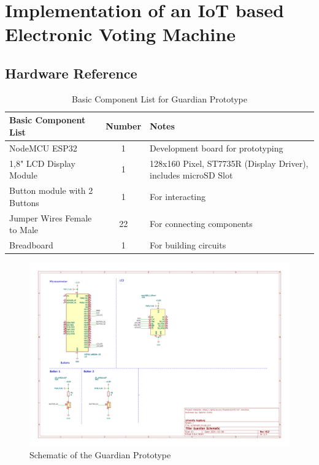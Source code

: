 \chapter{Implementation of an IoT based Electronic Voting Machine}

\section{Hardware Reference}

\begin{table}[h!]
    \centering
    \begin{tabular}{|l|c|p{5cm}|}
        \hline
        \textbf{Basic Component List} & \textbf{Number} & \textbf{Notes} \\
        \hline
        NodeMCU ESP32  & 1 & Development board for prototyping \\
        \hline
        1,8" LCD Display Module  & 1 & 128x160 Pixel, ST7735R (Display Driver), includes microSD Slot \\
        \hline
        Button module with 2 Buttons & 1 & For interacting \\
        \hline
		Jumper Wires Female to Male & 22 & For connecting components \\
        \hline
        Breadboard & 1 & For building circuits \\
        \hline
    \end{tabular}
    \caption{Basic Component List for Guardian Prototype}
    \label{tab:basic-component-list}
\end{table}

\begin{figure}
	\centering
	\includegraphics[scale=.5]{abbildungen/schematic.png}
	\caption{Schematic of the Guardian Prototype}
	\label{Fig:schematic}
\end{figure}

